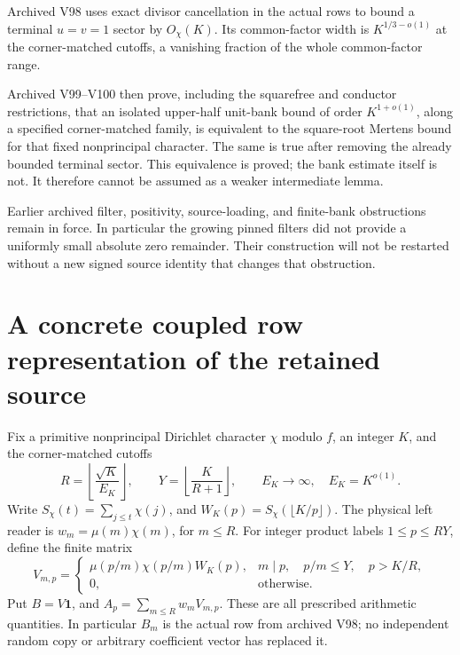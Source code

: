 \documentclass[11pt]{article}
\theoremstyle{remark}
\begin{document}
Archived V98 uses exact divisor cancellation in the actual rows to
bound a terminal \(u=v=1\) sector by \(O_\chi(K)\).  Its common-factor
width is \(K^{1/3-o(1)}\) at the corner-matched cutoffs, a vanishing
fraction of the whole common-factor range.

Archived V99--V100 then prove, including the squarefree and conductor
restrictions, that an isolated upper-half unit-bank bound of order
\(K^{1+o(1)}\), along a specified corner-matched family, is equivalent
to the square-root Mertens bound for that fixed nonprincipal character.
The same is true after removing the already bounded terminal sector.
This equivalence is proved; the bank estimate itself is not.
It therefore cannot be assumed as a weaker intermediate lemma.

Earlier archived filter, positivity, source-loading, and finite-bank
obstructions remain in force.  In particular the growing pinned
filters did not provide a uniformly small absolute zero remainder.
Their construction will not be restarted without a new signed source
identity that changes that obstruction.

\section{A concrete coupled row representation of the retained source}
\label{sec:c3v1-coupled-source}

Fix a primitive nonprincipal Dirichlet character \(\chi\) modulo
\(f\), an integer \(K\), and the corner-matched cutoffs
\[
 R=\left\lfloor\frac{\sqrt K}{E_K}\right\rfloor,\qquad
 Y=\left\lfloor\frac K{R+1}\right\rfloor,
 \qquad E_K\longrightarrow\infty,\quad E_K=K^{o(1)}.
\]
Write \(S_\chi(t)=\sum_{j\le t}\chi(j)\), and
\(W_K(p)=S_\chi(\lfloor K/p\rfloor)\).
The physical left reader is \(w_m=\mu(m)\chi(m)\), for \(m\le R\).
For integer product labels \(1\le p\le RY\), define the finite matrix
\begin{equation}
 V_{m,p}=\begin{cases}
 \mu(p/m)\chi(p/m)W_K(p),
       &m\mid p,\quad p/m\le Y,\quad p>K/R,\\
 0,&\text{otherwise}.
 \end{cases}
 \label{eq:c3v1-V}
\end{equation}
Put \(B=V\mathbf1\), and \(A_p=\sum_{m\le R}w_mV_{m,p}\).
These are all prescribed arithmetic quantities.  In particular
\(B_m\) is the actual row from archived V98; no independent random
copy or arbitrary coefficient vector has replaced it.
\end{document}

